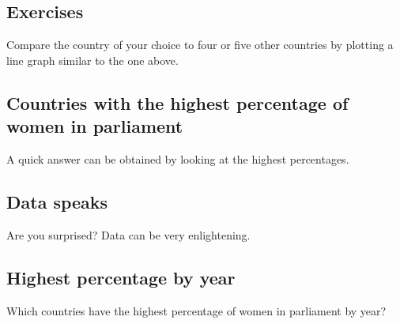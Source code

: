 \documentclass[a4paper,9pt,twocolumn,twoside,printwatermark=false]{pinp}
\begin{document}
\subsection{Exercises}\label{exercises}

Compare the country of your choice to four or five other countries by
plotting a line graph similar to the one above.

\subsection{Countries with the highest percentage of women in
parliament}\label{countries-with-the-highest-percentage-of-women-in-parliament}

A quick answer can be obtained by looking at the highest percentages.

\begin{Shaded}
\begin{Highlighting}[]
\NormalTok{WP[}\NormalTok{(}\OperatorTok{-}\NormalTok{)]}
\end{Highlighting}
\end{Shaded}

\subsection{Data speaks}\label{data-speaks}

Are you surprised? Data can be very enlightening.

\subsection{Highest percentage by
year}\label{highest-percentage-by-year}

Which countries have the highest percentage of women in parliament by
year?
\end{document}
